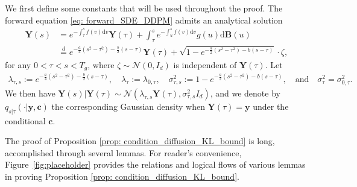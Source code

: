 \documentclass[11pt]{article}
\newcommand{\bY}{\mathbf{Y}}
\newcommand{\by}{\mathbf{y}}
\newcommand{\bc}{\mathbf{c}}
\newcommand{\bB}{\mathbf{B}}
\newcommand{\intd}{\mathrm{d}}
\begin{document}
We first define some constants that will be used throughout the proof. The forward equation \eqref{eq: forward_SDE_DDPM}  admits an analytical solution
\begin{align}
    \bY(s) &= e^{-\int_\tau^sf(v)\intd v}\bY(\tau) + \int_{\tau}^s e^{-\int_u^sf(v)\intd v}g(u) \intd \bB(u) \nonumber \\
    & \overset{d}{=}  e^{-\frac{a}{4}(s^2 - \tau^2) - \frac{b}{2}(s - \tau)}\bY(\tau) + \sqrt{1 - e^{-\frac{a}{2}(s^2 - \tau^2) - b(s - \tau)}}\cdot\zeta, \label{eq: DDPM_conditional_relation}
\end{align}
for any $0 < \tau < s < T_g$, where $\zeta\sim\mathcal{N}(0, I_d)$ is independent of $\bY(\tau)$. Let
\begin{align}\label{eq: forward_SDE_coeff}
    \lambda_{\tau, s} := e^{-\frac{a}{4}(s^2 - \tau^2) - \frac{b}{2}(s - \tau)}, \quad \lambda_\tau:= \lambda_{0,\tau}, \quad \sigma^2_{\tau, s} := 1 - e^{-\frac{a}{2}(s^2 - \tau^2) - b(s - \tau)},\quad \text{and}  \quad  \sigma_{\tau}^2 = \sigma^2_{0,\tau}.
\end{align}
 We then have $\bY(s) | \bY(\tau) \sim \mathcal{N}(\lambda_{\tau, s}\bY(\tau), \sigma^2_{\tau, s}I_d)$, and we denote by $q_{s|\tau}(\cdot | \by, \bc)$ the corresponding Gaussian density when $\bY(\tau) = \by$ under the conditional $\bc$.


The proof of Proposition \ref{prop: condition_diffusion_KL_bound} is long, accomplished through  several lemmas. For reader's convenience, Figure~\ref{fig:placeholder} provides the relations and logical flows of various lemmas in proving
Proposition \ref{prop: condition_diffusion_KL_bound}.
\end{document}
